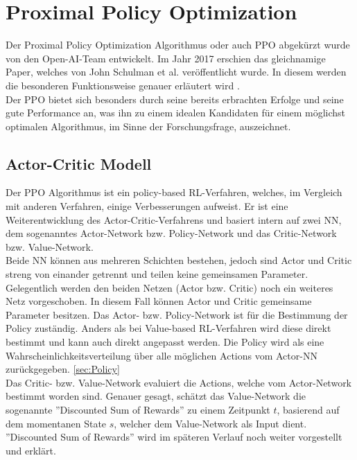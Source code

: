 \section{Proximal Policy Optimization} \label{sec:PPO}
Der Proximal Policy Optimization Algorithmus oder auch PPO abgekürzt wurde von den Open-AI-Team entwickelt. Im Jahr 2017 erschien das gleichnamige Paper, welches von John Schulman et al. veröffentlicht wurde. In diesem werden die besonderen Funktionsweise genauer erläutert wird \cite{PPO}.\\
Der PPO bietet sich besonders durch seine bereits erbrachten Erfolge \cite{PPO} und seine gute Performance an, was ihn zu einem idealen Kandidaten für einem möglichst optimalen Algorithmus, im Sinne der Forschungsfrage, auszeichnet.

\subsection{Actor-Critic Modell} \label{sec:actor_critic}
Der PPO Algorithmus ist ein policy-based RL-Verfahren, welches, im Vergleich mit anderen Verfahren, einige Verbesserungen aufweist. Er ist eine Weiterentwicklung des Actor-Critic-Verfahrens und basiert intern auf zwei NN, dem sogenanntes Actor-Network bzw. Policy-Network und das Critic-Network bzw. Value-Network. \cite[S. 273 f.]{Sutton1998}\\
Beide NN können aus mehreren Schichten bestehen, jedoch sind Actor und Critic streng von einander getrennt und teilen keine gemeinsamen Parameter. Gelegentlich werden den beiden Netzen (Actor bzw. Critic) noch ein weiteres Netz vorgeschoben. In diesem Fall können Actor und Critic gemeinsame Parameter besitzen.
Das Actor- bzw. Policy-Network ist für die Bestimmung der Policy zuständig. Anders als bei Value-based RL-Verfahren wird diese direkt bestimmt und kann auch direkt angepasst werden. Die Policy wird als eine Wahrscheinlichkeitsverteilung über alle möglichen Actions vom Actor-NN zurückgegeben. \ref{sec:Policy}\\
Das Critic- bzw. Value-Network evaluiert die Actions, welche vom Actor-Network bestimmt worden sind. Genauer gesagt, schätzt das Value-Network die sogenannte ''Discounted Sum of Rewards'' zu einem Zeitpunkt $t$, basierend auf dem momentanen State $s$, welcher dem Value-Network als Input dient. ''Discounted Sum of Rewards'' wird im späteren Verlauf noch weiter vorgestellt und erklärt.

